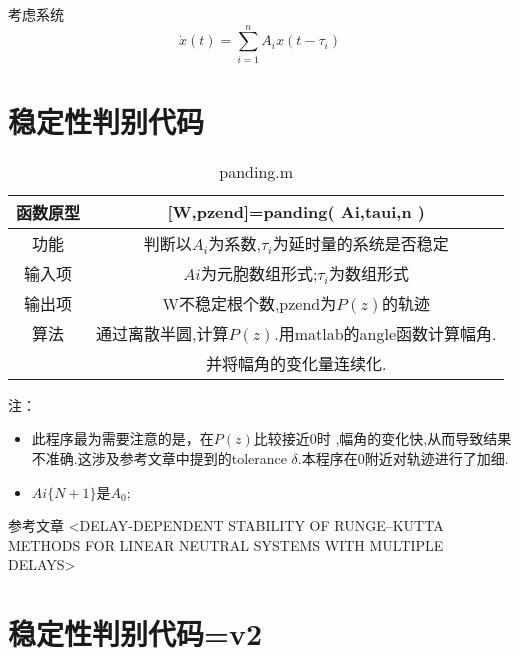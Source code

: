 \documentclass[11pt,a4paper]{ctexart}
\begin{document}
考虑系统
$$\dot{x}(t)=\sum_{i=1}^{n}A_ix(t-\tau_i)$$


\section{稳定性判别代码}

\begin{table}[hbt]
\caption{panding.m}  %
	\label{table1}  %
	\begin{tabular}{|c|c|} 
\hline
函数原型& [W,pzend]=panding( Ai,taui,n  )\\
\hline
功能& 判断以$A_i$为系数,$\tau_i$为延时量的系统是否稳定\\
\hline
输入项& $Ai$为元胞数组形式;$\tau_i$为数组形式\\
\hline
输出项&W不稳定根个数,pzend为$P(z)$的轨迹\\
\hline
算法&通过离散半圆,计算$P(z)$.用matlab的angle函数计算幅角.\\
&并将幅角的变化量连续化.\\
\hline
\end{tabular}
\end{table}
注：
\begin{itemize}
\item 此程序最为需要注意的是，在$P(z)$比较接近$0$时 ,幅角的变化快,从而导致结果不准确.这涉及参考文章中提到的tolerance $\delta$.本程序在$0$附近对轨迹进行了加细.
\item $Ai\{N+1\}$是$A_0$;
\end{itemize}


参考文章
<DELAY-DEPENDENT STABILITY OF RUNGE–KUTTA
METHODS FOR LINEAR NEUTRAL SYSTEMS
WITH MULTIPLE DELAYS>



\newpage

\section{稳定性判别代码=v2}
\end{document}
